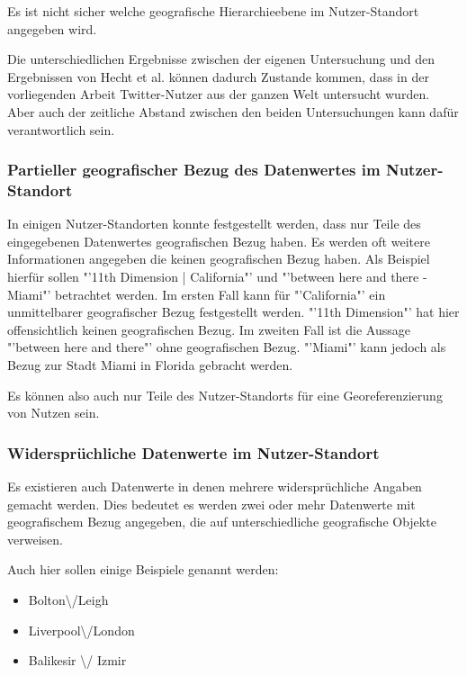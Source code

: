 				Es ist nicht sicher welche geografische Hierarchieebene im Nutzer-Standort angegeben wird. 

				Die unterschiedlichen Ergebnisse zwischen der eigenen Untersuchung und den Ergebnissen von Hecht et al. können dadurch Zustande kommen, dass in der vorliegenden Arbeit Twitter-Nutzer aus der ganzen Welt untersucht wurden.
				Aber auch der zeitliche Abstand zwischen den beiden Untersuchungen kann dafür verantwortlich sein.  



			\subsubsection{Partieller geografischer Bezug des Datenwertes im Nutzer-Standort} \label{subsec:partiellerGeografischerBezug} 

				In einigen Nutzer-Standorten konnte festgestellt werden, dass nur Teile des eingegebenen Datenwertes geografischen Bezug haben. 
				Es werden oft weitere Informationen angegeben die keinen geografischen Bezug haben. 
				Als Beispiel hierfür sollen "'11th Dimension | California"' und "'between here and there - Miami"' betrachtet werden.
				Im ersten Fall kann für "'California"' ein unmittelbarer geografischer Bezug festgestellt werden.
				"'11th Dimension"' hat hier offensichtlich keinen geografischen Bezug.
				Im zweiten Fall ist die Aussage "'between here and there"' ohne geografischen Bezug.
				"'Miami"' kann jedoch als Bezug zur Stadt Miami in Florida gebracht werden.
				
				Es können also auch nur Teile des Nutzer-Standorts für eine Georeferenzierung von Nutzen sein.

			\subsubsection*{Widersprüchliche Datenwerte im Nutzer-Standort} \label{subsec:wiederspruechlicheBezuege} 

				Es existieren auch Datenwerte in denen mehrere widersprüchliche Angaben gemacht werden.
				Dies bedeutet es werden zwei oder mehr Datenwerte mit geografischem Bezug angegeben, die auf unterschiedliche geografische Objekte verweisen.

				Auch hier sollen einige Beispiele genannt werden:

				\begin{itemize}
					\item Bolton\textbackslash/Leigh
					\item Liverpool\textbackslash/London
					\item  Balikesir \textbackslash/ Izmir	
				\end{itemize}							
					
